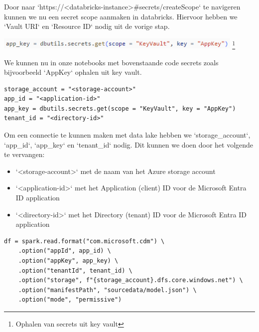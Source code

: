 Door naar `https://<databricks-instance>\#secrets/createScope` te navigeren kunnen we nu een secret scope aanmaken in databricks. Hiervoor hebben we `Vault URI` en `Resource ID` nodig uit de vorige stap.

\begin{center}
    \includegraphics[width=0.9\textwidth]{./graphics/databricks/connection_15.png}
    \footnote{Ophalen van secrets uit key vault}
\end{center}

We kunnen nu in onze notebooks met bovenstaande code secrets zoals bijvoorbeeld `AppKey` ophalen uit key vault.


\begin{verbatim}
storage_account = "<storage-account>"
app_id = "<application-id>"
app_key = dbutils.secrets.get(scope = "KeyVault", key = "AppKey")
tenant_id = "<directory-id>"
\end{verbatim}

Om een connectie te kunnen maken met data lake hebben we `storage\_account`, `app\_id`, `app\_key` en `tenant\_id` nodig. Dit kunnen we doen door het volgende te vervangen:

\begin{itemize}
    \item `<storage-account>` met de naam van het Azure storage account
    \item `<application-id>` met het Application (client) ID voor de Microsoft Entra ID application
    \item `<directory-id>` met het Directory (tenant) ID voor de Microsoft Entra ID application
\end{itemize}


\begin{verbatim}
df = spark.read.format("com.microsoft.cdm") \
    .option("appId", app_id) \
    .option("appKey", app_key) \
    .option("tenantId", tenant_id) \
    .option("storage", f"{storage_account}.dfs.core.windows.net") \
    .option("manifestPath", "sourcedata/model.json") \
    .option("mode", "permissive")
\end{verbatim}

